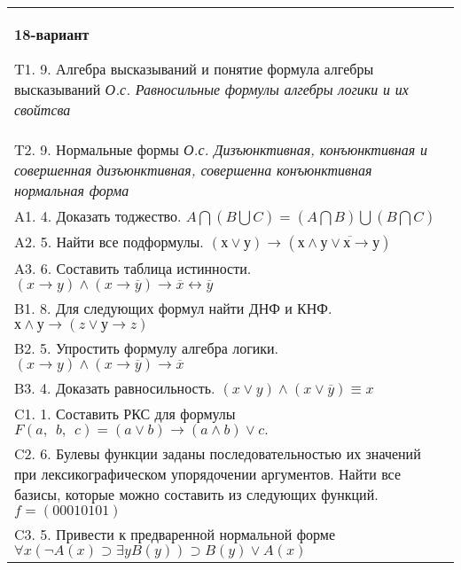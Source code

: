 \documentclass{article}
\begin{document}
\begin{tabular}{m{17cm}}
\textbf{18-вариант}
\newline

T1. 9. Алгебра высказываний и понятие формула алгебры высказываний \emph{О.с. Равносильные формулы алгебры логики и их свойтсва} \\
T2. 9. Нормальные формы \emph{О.с. Дизъюнктивная, конъюнктивная и совершенная дизъюнктивная, совершенна конъюнктивная нормальная форма} \\
A1. 4. Доказать тоджество. \(A\bigcap(B\bigcup C) = (A\bigcap B)\bigcup(B\bigcap C)\) \\
A2. 5. Найти все подформулы. \((х \vee у) \rightarrow \left( х \land \overline{у \vee х \rightarrow у} \right)\) \\
A3. 6. Составить таблица истинности. \((x \rightarrow y) \land (x \rightarrow \overline{y}) \rightarrow \overline{x} \leftrightarrow \overline{y}\) \\
B1. 8. Для следующих формул найти ДНФ и КНФ. \(х \land у \rightarrow (z \vee у \rightarrow z)\) \\
B2. 5. Упростить формулу алгебра логики. \((x \rightarrow y) \land (x \rightarrow \overline{y}) \rightarrow \overline{x}\) \\
B3. 4. Доказать равносильность. \((x \vee y) \land (x \vee \overline{y}) \equiv x\) \\
C1. 1. Составить РКС для формулы \(F(a,\ \ b,\ \ c) = (a \vee b) \rightarrow (a \land b) \vee c.\) \\
C2. 6. Булевы функции заданы последовательностью их значений при лексикографическом упорядочении аргументов. Найти все базисы, которые можно составить из следующих функций. \(f = (00010101)\) \\
C3. 5. Привести к предваренной нормальной форме \(\forall x(\neg A(x) \supset \exists yB(y)) \supset B(y) \vee A(x)\) \\

\end{tabular}
\vspace{1cm}
\end{document}
